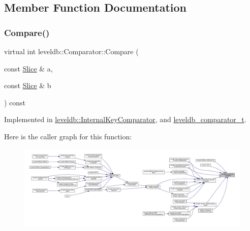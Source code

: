 \subsection{Member Function Documentation}
\mbox{\label{structleveldb_1_1_comparator_a05dae6edcad3c7db23827c0233d74039}} 
\subsubsection{\texorpdfstring{Compare()}{Compare()}}
{\footnotesize\ttfamily virtual int leveldb\+::\+Comparator\+::\+Compare (\begin{DoxyParamCaption}\item[{const \mbox{\hyperlink{classleveldb_1_1_slice}{Slice}} \&}]{a,  }\item[{const \mbox{\hyperlink{classleveldb_1_1_slice}{Slice}} \&}]{b }\end{DoxyParamCaption}) const\hspace{0.3cm}{\ttfamily [pure virtual]}}



Implemented in \mbox{\hyperlink{classleveldb_1_1_internal_key_comparator_a8ee088d285165f692f2f03ac5b3e13b1}{leveldb\+::\+Internal\+Key\+Comparator}}, and \mbox{\hyperlink{structleveldb__comparator__t_abad34abeefd52bcfd421e14f426f6d05}{leveldb\+\_\+comparator\+\_\+t}}.

Here is the caller graph for this function\+:
\nopagebreak
\begin{figure}[H]
\begin{center}
\leavevmode
\includegraphics[width=350pt]{structleveldb_1_1_comparator_a05dae6edcad3c7db23827c0233d74039_icgraph}
\end{center}
\end{figure}
\mbox{\label{structleveldb_1_1_comparator_abdfe6076225e95b91ffd94f646063115}} 
